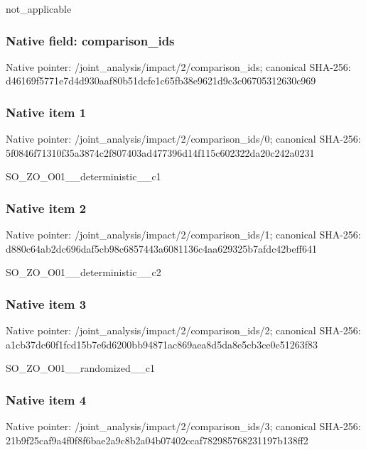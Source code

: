 \documentclass[10pt,a4paper]{article}
\begin{document}
not\_applicable


\subsubsection{Native field: comparison\_ids}


Native pointer: /joint\_analysis/impact/2/comparison\_ids; canonical SHA-256: d46169f5771e7d4d930aaf80\allowbreak{}b51dcfe1c65fb38e9621d9c3\allowbreak{}c06705312630c969



\subsubsection{Native item 1}


Native pointer: /joint\_analysis/impact/2\allowbreak{}/comparison\_ids/0; canonical SHA-256: 5f0846f71310f35a3874c2f8\allowbreak{}07403ad477396d14f115c602\allowbreak{}322da20c242a0231


SO\_ZO\_O01\_\_deterministic\_\_c1


\subsubsection{Native item 2}


Native pointer: /joint\_analysis/impact/2\allowbreak{}/comparison\_ids/1; canonical SHA-256: d880c64ab2dc696daf5cb98c\allowbreak{}6857443a6081136c4aa62932\allowbreak{}5b7afdc42beff641


SO\_ZO\_O01\_\_deterministic\_\_c2


\subsubsection{Native item 3}


Native pointer: /joint\_analysis/impact/2\allowbreak{}/comparison\_ids/2; canonical SHA-256: a1cb37dc60f1fcd15b7e6d62\allowbreak{}00bb94871ac869aea8d5da8e\allowbreak{}5cb3ce0e51263f83


SO\_ZO\_O01\_\_randomized\_\_c1


\subsubsection{Native item 4}


Native pointer: /joint\_analysis/impact/2\allowbreak{}/comparison\_ids/3; canonical SHA-256: 21b9f25caf9a4f0f8f6bae2a\allowbreak{}9c8b2a04b07402ccaf782985\allowbreak{}768231197b138ff2
\end{document}
